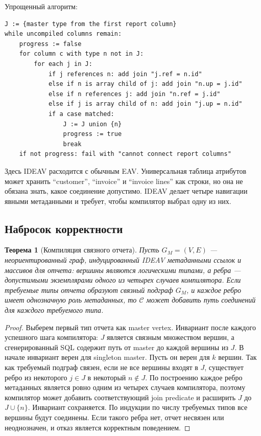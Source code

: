 \documentclass[11pt]{article}
\newtheorem{theorem}{Теорема}
\begin{document}
Упрощенный алгоритм:

\begin{verbatim}
J := {master type from the first report column}
while uncompiled columns remain:
    progress := false
    for column c with type n not in J:
        for each j in J:
            if j references n: add join "j.ref = n.id"
            else if n is array child of j: add join "n.up = j.id"
            else if n references j: add join "n.ref = j.id"
            else if j is array child of n: add join "j.up = n.id"
            if a case matched:
                J := J union {n}
                progress := true
                break
    if not progress: fail with "cannot connect report columns"
\end{verbatim}

Здесь IDEAV расходится с обычным EAV. Универсальная таблица атрибутов может
хранить ``customer'', ``invoice'' и ``invoice lines'' как строки, но она не
обязана знать, какое соединение допустимо. IDEAV делает четыре навигации явными
метаданными и требует, чтобы компилятор выбрал одну из них.

\subsection{Набросок корректности}

\begin{theorem}[Компиляция связного отчета]
Пусть \(G_M=(V,E)\) --- неориентированный граф, индуцированный IDEAV
метаданными ссылок и массивов для отчета: вершины являются логическими типами, а
ребра --- допустимыми экземплярами одного из четырех случаев компилятора. Если
требуемые типы отчета образуют связный подграф \(G_M\), и каждое ребро имеет
однозначную роль метаданных, то \(\mathcal{C}\) может добавить путь соединений
для каждого требуемого типа.
\end{theorem}

\begin{proof}
Выберем первый тип отчета как master vertex. Инвариант после каждого успешного
шага компилятора: \(J\) является связным множеством вершин, а сгенерированный SQL
содержит путь от master до каждой вершины из \(J\). В начале инвариант верен
для singleton master. Пусть он верен для \(k\) вершин. Так как требуемый подграф
связен, если не все вершины входят в \(J\), существует ребро из некоторого
\(j \in J\) в некоторый \(n \notin J\). По построению каждое ребро метаданных
является ровно одним из четырех случаев компилятора, поэтому компилятор может
добавить соответствующий join predicate и расширить \(J\) до
\(J \cup \{n\}\). Инвариант сохраняется. По индукции по числу требуемых типов
все вершины будут соединены. Если такого ребра нет, отчет несвязен или
неоднозначен, и отказ является корректным поведением.
\end{proof}
\end{document}
